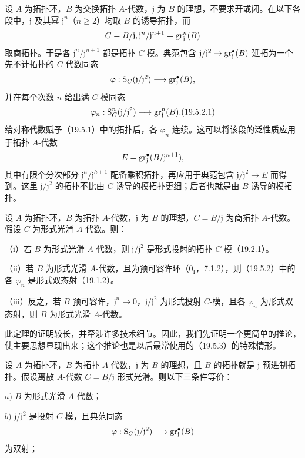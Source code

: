 设 $A$ 为拓扑环，$B$ 为交换拓扑 $A$-代数，$\mathfrak j$ 为 $B$ 的理想，不要求开或闭。在以下各段中，$\mathfrak j$ 及其幂 $\mathfrak j^n$（$n\geq2$）均取 $B$ 的诱导拓扑，而
\[
 C=B/\mathfrak j,
 \mathfrak j^n/\mathfrak j^{n+1}=\operatorname{gr}_{\mathfrak j}^n(B)
\]
取商拓扑。于是各 $\mathfrak j^n/\mathfrak j^{n+1}$ 都是拓扑 $C$-模。典范包含
$\mathfrak j/\mathfrak j^2\to\operatorname{gr}_{\mathfrak j}^{\bullet}(B)$ 延拓为一个先不计拓扑的 $C$-代数同态
\[
 \varphi:\mathrm S_C(\mathfrak j/\mathfrak j^2)
        \longrightarrow\operatorname{gr}_{\mathfrak j}^{\bullet}(B),
\]
并在每个次数 $n$ 给出满 $C$-模同态
\begin{equation}
 \varphi_n:\Salg_C^n(\mathfrak j/\mathfrak j^2)
         \longrightarrow\gr_{\mathfrak j}^n(B).
 \tag{19.5.2.1}
\end{equation}
给对称代数赋予（19.5.1）中的拓扑后，各 $\varphi_n$ 连续。这可以将该段的泛性质应用于拓扑 $A$-代数
\[
 E=\operatorname{gr}_{\mathfrak j}^{\bullet}(B/\mathfrak j^{n+1}),
\]
其中有限个分次部分 $\mathfrak j^h/\mathfrak j^{h+1}$ 配备乘积拓扑，再应用于典范包含 $\mathfrak j/\mathfrak j^2\to E$ 而得到。这里 $\mathfrak j/\mathfrak j^2$ 的拓扑不比由 $C$ 诱导的模拓扑更细；后者也就是由 $B$ 诱导的模拓扑。

设 $A$ 为拓扑环，$B$ 为拓扑 $A$-代数，$\mathfrak j$ 为 $B$ 的理想，$C=B/\mathfrak j$ 为商拓扑 $A$-代数。假设 $C$ 为形式光滑 $A$-代数。则：

（i）若 $B$ 为形式光滑 $A$-代数，则 $\mathfrak j/\mathfrak j^2$ 是形式投射的拓扑 $C$-模（19.2.1）。

（ii）若 $B$ 为形式光滑 $A$-代数，且为预可容许环（$0_{\mathrm I}$，7.1.2），则（19.5.2）中的各 $\varphi_n$ 是形式双态射（19.1.2）。

（iii）反之，若 $B$ 预可容许，$\mathfrak j^n\to0$，$\mathfrak j/\mathfrak j^2$ 为形式投射 $C$-模，且各 $\varphi_n$ 为形式双态射，则 $B$ 为形式光滑 $A$-代数。

此定理的证明较长，并牵涉许多技术细节。因此，我们先证明一个更简单的推论，使主要思想显现出来；这个推论也是以后最常使用的（19.5.3）的特殊情形。

设 $A$ 为拓扑环，$B$ 为拓扑 $A$-代数，$\mathfrak j$ 为 $B$ 的理想，且 $B$ 的拓扑就是 $\mathfrak j$-预进制拓扑。假设离散 $A$-代数 $C=B/\mathfrak j$ 形式光滑。则以下三条件等价：

$a)$ $B$ 为形式光滑 $A$-代数；

$b)$ $\mathfrak j/\mathfrak j^2$ 是投射 $C$-模，且典范同态
\[
 \varphi:\mathrm S_C(\mathfrak j/\mathfrak j^2)
           \longrightarrow\operatorname{gr}_{\mathfrak j}^{\bullet}(B)
\]
为双射；

